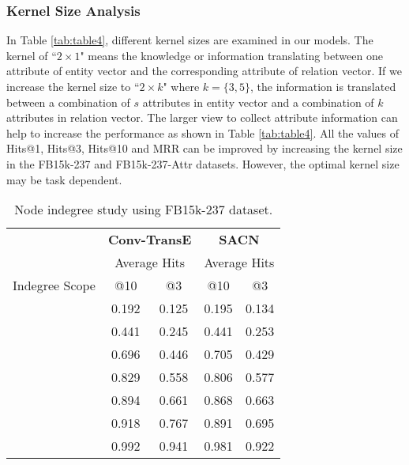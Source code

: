 \documentclass[letterpaper]{article} \usepackage{aaai19}  \usepackage{times}  \usepackage{helvet}  \usepackage{courier}  \usepackage{url}  \usepackage{graphicx}  \usepackage{amsmath}
\begin{document}
\subsubsection{Kernel Size Analysis}

In Table \ref{tab:table4}, different kernel sizes are examined in our models. The kernel of ``$2 \times 1$" means the knowledge or information translating between one attribute of entity vector and the corresponding attribute of relation vector. 
If we increase the kernel size to ``$2 \times k$" where $k = \{3,5\}$, the information is translated between a combination of $s$ attributes in entity vector and a combination of $k$ attributes in relation vector. The larger view to collect attribute information can help to increase the performance as shown in Table \ref{tab:table4}. All the values of Hits@1, Hits@3, Hits@10 and MRR can be improved by increasing the kernel size in the FB15k-237 and FB15k-237-Attr datasets. However, the optimal kernel size may be task dependent.


\begin{table}
\caption{Node indegree study using FB15k-237 dataset.}
    \bigskip
    \label{tab:table5}
    \tabcolsep=0.25cm
    \centering
    \begin{tabular}{c|c|c|c|c}
        \hline
         & \multicolumn{2}{c|}{\textbf{Conv-TransE}}& \multicolumn{2}{c}{\textbf{SACN}} \\
        \cline{2-5}
         & \multicolumn{2}{c|}{Average Hits} & \multicolumn{2}{c}{Average Hits}  \\
        \cline{2-5}
         Indegree Scope & @10 & @3 & @10 & @3  \\
        \hline
        \hline
         [0,100] & 0.192 & 0.125 & 0.195 & 0.134 \\
        \hline
         [100,200] & 0.441 & 0.245 & 0.441 & 0.253  \\
        \hline
         [200,300] & 0.696 & 0.446 & 0.705 & 0.429  \\
        \hline
        [300,400]  & 0.829 & 0.558 &0.806 & 0.577  \\
\hline
        [400,500] & 0.894 & 0.661 & 0.868 & 0.663  \\
        \hline
        [500,1000]  & 0.918 & 0.767 & 0.891 & 0.695  \\
        \hline
        [1000, maximum]& 0.992 & 0.941 & 0.981 & 0.922\\
        \hline
\end{tabular}
\end{table}
\end{document}
